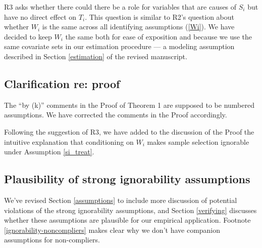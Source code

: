 \documentclass[hidelinks,12pt,letterpaper]{article}
\begin{document}
R3 asks whether there could there be a role for variables that are causes of $S_i$ but have no direct effect on $T_i$. This question is similar to R2's question about whether $W_i$ is the same across all identifying assumptions (\ref{Wi}). We have decided to keep $W_i$ the same both for ease of exposition and because we use the same covariate sets in our estimation procedure --- a modeling assumption described in Section \ref{estimation} of the revised manuscript. 

\subsection{Clarification re: proof}


The ``by (k)'' comments in the Proof of Theorem 1 are supposed to be numbered assumptions. We have corrected the comments in the Proof accordingly. 


Following the suggestion of R3, we have added to the discussion of the Proof the intuitive explanation that conditioning on $W_i$ makes sample selection ignorable under Assumption \ref{si_treat}. 

\subsection{Plausibility of strong ignorability assumptions}

We've revised Section \ref{assumptions} to include more discussion of potential violations of the strong ignorability assumptions, and Section \ref{verifying} discusses whether these assumptions are plausible for our empirical application. Footnote \ref{ignorability-noncompliers} makes clear why we don’t have companion assumptions for non-compliers.
\end{document}
